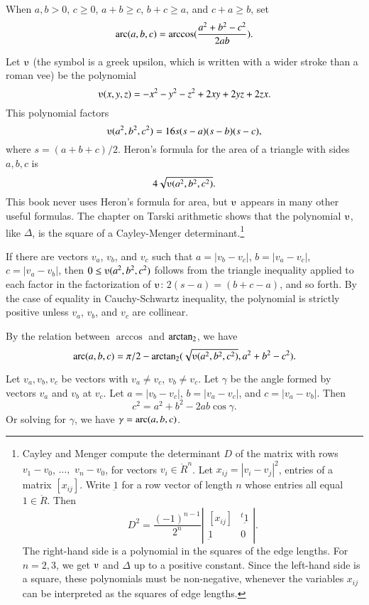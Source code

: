 \begin{definition}[arc]
When $a,b>0$, $c\ge0$,  $a + b \ge c$, $b + c \ge a$, 
and $c+a \ge b$, set 
 $$\operatorname{arc}(a,b,c) = \arccos(\frac{a^2 + b^2 - c^2}{2 a b}).$$
\end{definition}

Let $\ups$ (the symbol is a greek upsilon, which is written with a
wider stroke than a roman vee) be the polynomial
    $$\ups(x,y,z) = -x^2 - y^2 - z^2 + 2 x y + 2 y z + 2 z x.$$
This polynomial factors
    $$\ups(a^2,b^2,c^2) = 16 s (s-a) (s-b) (s-c),$$
where $s = (a+b+c)/2$.  Heron's formula for the area of 
a triangle with
sides $a,b,c$ is $$4\sqrt{\ups(a^2,b^2,c^2)}.$$  This
book never uses Heron's formula for area, but $\ups$
appears in many other useful formulas.  The chapter on
Tarski arithmetic shows that the polynomial
$\ups$, like $\Delta$, 
is the square of a Cayley-Menger determinant.\footnote{
Cayley and Menger compute the determinant $D$ of the
matrix with rows $v_1-v_0$, $\ldots,$ $v_n-v_0$, 
for vectors $v_i\in\ring{R}^n$.   Let
$x_{ij} = |v_i-v_j|^2$, entries of a matrix $[x_{ij}]$.
Write $\underbar 1$ for a row vector of length $n$ 
whose entries all equal $1\in\ring{R}$.
Then 
$$
D^2 = \frac{(-1)^{n-1}}{2^n}
    \left|\begin{matrix}[x_{ij}]& {}^t{\underbar 1}\\ {\underbar 1}& 0
        \end{matrix}\right|.
$$
The right-hand side is a polynomial in the squares of the edge lengths.
For $n=2,3$, we get $\ups$  and $\Delta$ up to a positive constant.  Since
the left-hand side is a square, these polynomials must
be non-negative, whenever the variables $x_{ij}$ can be interpreted
as the squares of edge lengths.}



If there are vectors $v_a$, $v_b$, and $v_c$ such that $a = |v_b
- v_c|$, $b = |v_a - v_c|$, $c = |v_a - v_b|$, then $0\le
\ups(a^2,b^2,c^2)$ follows from the triangle inequality applied to
each factor in the factorization of $\ups$: $2(s-a) = (b+c-a)$, and
so forth.  By the case of equality in Cauchy-Schwartz
inequality, the polynomial is strictly positive unless $v_a$,
$v_b$, and $v_c$ are collinear.

By the relation between $\arccos$ and ${\operatorname{arctan_2}}$, we have
  $$
  \arc(a,b,c) = 
    \pi/2 - \atn({\sqrt{\ups(a^2,b^2,c^2)}},{ a^2 + b^2 - c^2}).
    $$



\begin{lemma}
Let $v_a,v_b,v_c$ be vectors with $v_a\ne v_c$, $v_b\ne v_c$.
    Let $\gamma$ be the angle formed by vectors $v_a$ and $v_b$ at $v_c$.  Let $a
    = |v_b - v_c|$, $b = |v_a - v_c|$, and $c = |v_a - v_b|$.  Then
        $$c^2 = a^2 + b^2 - 2 a b \cos\gamma.$$
Or solving for $\gamma$, we have $\gamma = \operatorname{arc}(a,b,c)$.

\end{lemma} 

